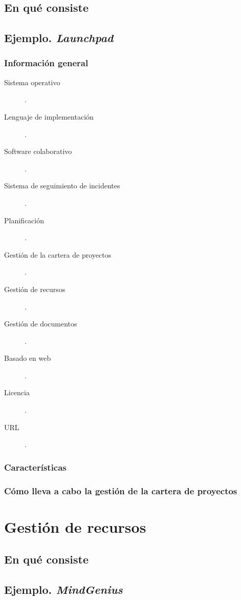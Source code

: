 \documentclass[11pt,a4paper,spanish,twoside]{report}
\begin{document}
\section{En qué consiste}
\section{Ejemplo. \emph{Launchpad}}
  \subsection{Información general}
    \begin{description}
		\item[Sistema operativo]. 
		\item[Lenguaje de implementación].
    \item[Software colaborativo]. 
    \item[Sistema de seguimiento de incidentes]. 
		\item[Planificación].
		\item[Gestión de la cartera de proyectos].
		\item[Gestión de recursos].
		\item[Gestión de documentos].
		\item[Basado en web].
		\item[Licencia].
		\item[URL].
		\end{description}
	\subsection{Características}
	\subsection{Cómo lleva a cabo la gestión de la cartera de proyectos}

\chapter{Gestión de recursos}
\section{En qué consiste}
\section{Ejemplo. \emph{MindGenius}}
\end{document}
